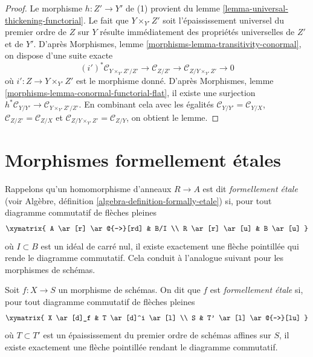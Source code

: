 \begin{proof}
Le morphisme $h : Z' \to Y'$ de (1) provient du
lemme \ref{lemma-universal-thickening-functorial}.
Le fait que $Y \times_{Y'} Z'$ soit l'épaississement universel du premier
ordre de $Z$ sur $Y$ résulte immédiatement des propriétés universelles
de $Z'$ et de $Y'$. D'après
Morphismes, lemme \ref{morphisms-lemma-transitivity-conormal},
on dispose d'une suite exacte
$$
(i')^*\mathcal{C}_{Y \times_{Y'} Z'/Z'} \to
\mathcal{C}_{Z/Z'} \to
\mathcal{C}_{Z/Y \times_{Y'} Z'} \to 0
$$
où $i' : Z \to Y \times_{Y'} Z'$ est le morphisme donné. D'après
Morphismes, lemme \ref{morphisms-lemma-conormal-functorial-flat},
il existe une surjection
$h^*\mathcal{C}_{Y/Y'} \to \mathcal{C}_{Y \times_{Y'} Z'/Z'}$.
En combinant cela avec les égalités
$\mathcal{C}_{Y/Y'} = \mathcal{C}_{Y/X}$,
$\mathcal{C}_{Z/Z'} = \mathcal{C}_{Z/X}$ et
$\mathcal{C}_{Z/Y \times_{Y'} Z'} = \mathcal{C}_{Z/Y}$,
on obtient le lemme.
\end{proof}












\section{Morphismes formellement étales}
\label{section-formally-etale}

\noindent
Rappelons qu'un homomorphisme d'anneaux $R \to A$ est dit {\it formellement étale}
(voir Algèbre, définition \ref{algebra-definition-formally-etale})
si, pour tout diagramme commutatif de flèches pleines
$$
\xymatrix{
A \ar[r] \ar@{-->}[rd] & B/I \\
R \ar[r] \ar[u] & B \ar[u]
}
$$
où $I \subset B$ est un idéal de carré nul, il existe
exactement une flèche pointillée qui rende le diagramme commutatif. Cela conduit
à l'analogue suivant pour les morphismes de schémas.

\begin{definition}
\label{definition-formally-etale}
Soit $f : X \to S$ un morphisme de schémas.
On dit que $f$ est {\it formellement étale} si, pour tout diagramme commutatif de flèches pleines
$$
\xymatrix{
X \ar[d]_f & T \ar[d]^i \ar[l] \\
S & T' \ar[l] \ar@{-->}[lu]
}
$$
où $T \subset T'$ est un épaississement du premier ordre de schémas affines sur $S$,
il existe exactement une flèche pointillée rendant le diagramme commutatif.
\end{definition}

